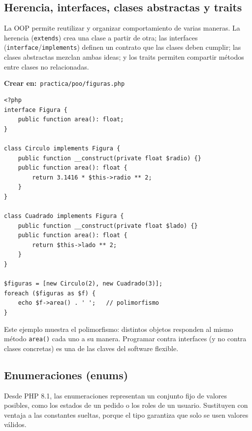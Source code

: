 \documentclass[11pt]{article}
\begin{document}
\subsection{Herencia, interfaces, clases abstractas y traits}
La OOP permite reutilizar y organizar comportamiento de varias maneras. La herencia (\texttt{extends}) crea una clase a partir de otra; las interfaces (\texttt{interface}/\texttt{implements}) definen un contrato que las clases deben cumplir; las clases abstractas mezclan ambas ideas; y los traits permiten compartir métodos entre clases no relacionadas.

{\small\color{phpazulo}\textbf{Crear en:}~}\texttt{practica/\allowbreak{}poo/\allowbreak{}figuras.\allowbreak{}php}\par\nobreak\vspace{-1pt}
\begin{cajacodigo}
\begin{lstlisting}[style=php]
<?php
interface Figura {
    public function area(): float;
}

class Circulo implements Figura {
    public function __construct(private float $radio) {}
    public function area(): float {
        return 3.1416 * $this->radio ** 2;
    }
}

class Cuadrado implements Figura {
    public function __construct(private float $lado) {}
    public function area(): float {
        return $this->lado ** 2;
    }
}

$figuras = [new Circulo(2), new Cuadrado(3)];
foreach ($figuras as $f) {
    echo $f->area() . ' ';   // polimorfismo
}
\end{lstlisting}
\end{cajacodigo}
\vspace{2pt}
Este ejemplo muestra el polimorfismo: distintos objetos responden al mismo método \texttt{area()} cada uno a su manera. Programar contra interfaces (y no contra clases concretas) es una de las claves del software flexible.

\subsection{Enumeraciones (enums)}
Desde PHP 8.1, las enumeraciones representan un conjunto fijo de valores posibles, como los estados de un pedido o los roles de un usuario. Sustituyen con ventaja a las constantes sueltas, porque el tipo garantiza que solo se usen valores válidos.
\end{document}
